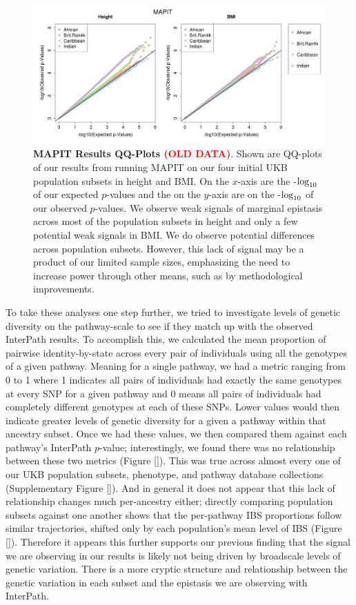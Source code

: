 \documentclass[12pt, a4paper]{article}
\def\log{{\rm log}}
\newcommand{\red}[1]{\textcolor{red}{#1}}
\begin{document}
\begin{figure}[htbp]
\centering
\includegraphics[scale=.35]{Images/InterPath_Main_Figure_MAPIT_vs1.png}
\caption[TBD]{\textbf{MAPIT Results QQ-Plots \red{(OLD DATA)}}. Shown are QQ-plots of our results from running MAPIT on our four initial UKB population subsets in height and BMI. On the $x$-axis are the -$\log_{10}$ of our expected $p$-values and the on the $y$-axis are on the -$\log_{10}$ of our observed $p$-values. We observe weak signals of marginal epistasis across most of the population subsets in height and only a few potential weak signals in BMI. We do observe potential differences across population subsets. However, this lack of signal may be a product of our limited sample sizes, emphasizing the need to increase power through other means, such as by methodological improvements.}
\label{InterPath-Main-Figure-Eigenvalues}
\end{figure}

To take these analyses one step further, we tried to investigate levels of genetic diversity on the pathway-scale to see if they match up with the observed InterPath results. To accomplish this, we calculated the mean proportion of pairwise identity-by-state across every pair of individuals using all the genotypes of a given pathway. Meaning for a single pathway, we had a metric ranging from 0 to 1 where 1 indicates all pairs of individuals had exactly the same genotypes at every SNP for a given pathway and 0 means all pairs of individuals had completely different genotypes at each of these SNPs. Lower values would then indicate greater levels of genetic diversity for a given a pathway within that ancestry subset. Once we had these values, we then compared them against each pathway's InterPath $p$-value; interestingly, we found there was no relationship between these two metrics (Figure \ref{}). This was true across almost every one of our UKB population subsets, phenotype, and pathway database collections (Supplementary Figure \ref{}). And in general it does not appear that this lack of relationship changes much per-ancestry either; directly comparing population subsets against one another shows that the per-pathway IBS proportions follow similar trajectories, shifted only by each population's mean level of IBS (Figure \ref{}). Therefore it appears this further supports our previous finding that the signal we are observing in our results is likely not being driven by broadscale levels of genetic variation. There is a more cryptic structure and relationship between the genetic variation in each subset and the epistasis we are observing with InterPath. 
\end{document}
